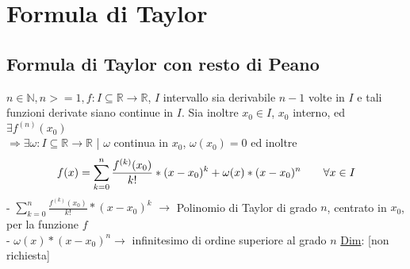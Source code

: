 \documentclass{article}
\begin{document}
\section{Formula di Taylor}
\subsection{Formula di Taylor con resto di Peano}
$n \in \mathbb{N},n >= 1, f: I \subseteq \mathbb{R} \to \mathbb{R}$, $I$ intervallo sia derivabile $n-1$ volte in $I$ e tali funzioni derivate siano continue in $I$. Sia inoltre $x_0 \in I$, $x_0$ interno, ed $\exists f^{(n)}(x_0)$\\
$\Rightarrow \exists \omega: I \subseteq \mathbb{R} \to \mathbb{R}$ | $\omega$ continua in $x_0$, $\omega (x_0) = 0$ ed inoltre
\[\scalebox{1}{$\displaystyle f(x) = \sum_ {k=0}^{n} \frac{f^{(k)}(x_0)}{k!} * (x - x_0)^k + \omega(x)*(x-x_0)^n \qquad \forall x \in I$}\]
- $\displaystyle \sum_ {k=0}^{n} \frac{f^{(k)}(x_0)}{k!} * (x - x_0)^k$  $\to$ Polinomio di Taylor di grado $n$, centrato in $x_0$, per la funzione $f$\\
- $\omega(x)*(x-x_0)^n \to$ infinitesimo di ordine superiore al grado $n$ 
\bigbreak 
\noindent \underline{Dim}: [non richiesta]
\end{document}
